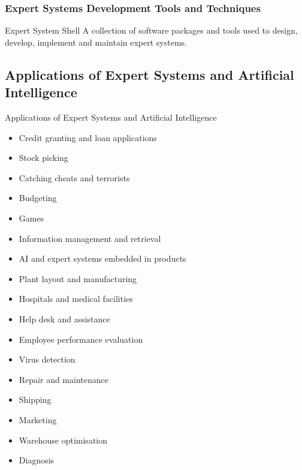 \documentclass[\main/notes.tex]{subfiles}
\begin{document}
				\subsubsection{Expert Systems Development Tools and Techniques}
					\begin{definition}{Expert System Shell}
						A collection of software packages and tools used to design, develop, implement and maintain expert systems.
					\end{definition}
			\subsection{Applications of Expert Systems and Artificial Intelligence}
				\begin{sidenote}{Applications of Expert Systems and Artificial Intelligence}
					\begin{multicols}{2}
						\begin{itemize}[nosep]
							\item Credit granting and loan applications
							\item Stock picking
							\item Catching cheats and terrorists
							\item Budgeting
							\item Games
							\item Information management and retrieval
							\item AI and expert systems embedded in products
							\item Plant layout and manufacturing
							\item Hospitals and medical facilities
							\item Help desk and assistance
							\item Employee performance evaluation
							\item Virus detection
							\item Repair and maintenance
							\item Shipping
							\item Marketing
							\item Warehouse optimisation
							\item Diagnosis
						\end{itemize}
					\end{multicols}
				\end{sidenote}

	\vbox{}
\end{document}

